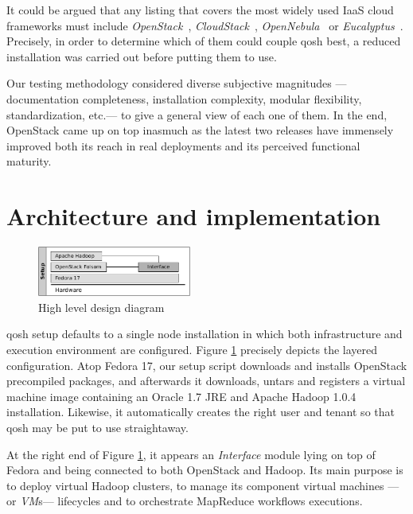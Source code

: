 \documentclass[conference]{IEEEtran}
\begin{document}
It could be argued that any listing that covers the most widely used IaaS cloud frameworks must include \emph{OpenStack}~\cite{openstack:2013:online}, \emph{CloudStack}~\cite{cloudstack:2013:online}, \emph{OpenNebula}~\cite{opennebula} or \emph{Eucalyptus}~\cite{eucalyptus}. Precisely, in order to determine which of them could couple qosh best, a reduced installation was carried out before putting them to use.

Our testing methodology considered diverse subjective magnitudes ---documentation completeness, installation complexity, modular flexibility, standardization, etc.--- to give a general view of each one of them. In the end, OpenStack came up on top inasmuch as the latest two releases have immensely improved both its reach in real deployments and its perceived functional maturity.



\section{Architecture and implementation}\label{sec:arch}

\begin{figure}[tp]
\centering
\includegraphics[width=0.45\textwidth]{img/002}
\caption{High level design diagram}
\label{fig:arch1}
\end{figure}

\noindent qosh setup defaults to a single node installation in which both infrastructure and execution environment are configured. Figure \ref{fig:arch1} precisely depicts the layered configuration. Atop Fedora 17, our setup script downloads and installs OpenStack precompiled packages, and afterwards it downloads, untars and registers a virtual machine image containing an Oracle 1.7 JRE and Apache Hadoop 1.0.4 installation. Likewise, it automatically creates the right user and tenant so that qosh may be put to use straightaway.

At the right end of Figure \ref{fig:arch1}, it appears an \emph{Interface} module lying on top of Fedora and being connected to both OpenStack and Hadoop. Its main purpose is to deploy virtual Hadoop clusters, to manage its component virtual machines ---or \emph{VM}s--- lifecycles and to orchestrate MapReduce workflows executions.
\end{document}
